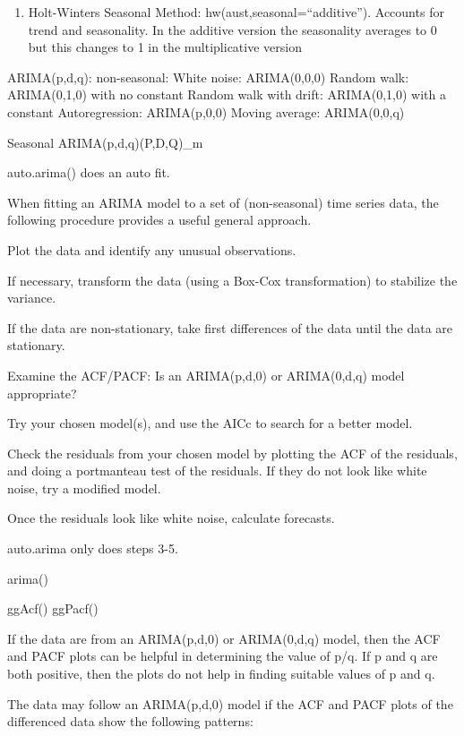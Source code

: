 \documentclass[]{book}
\providecommand{\tightlist}{%
  \setlength{\itemsep}{0pt}\setlength{\parskip}{0pt}}
\theoremstyle{definition}
\theoremstyle{definition}
\theoremstyle{definition}
\theoremstyle{remark}
\begin{document}
\begin{enumerate}
\def\labelenumi{\arabic{enumi}.}
\setcounter{enumi}{7}
\tightlist
\item
  Holt-Winters Seasonal Method: hw(aust,seasonal=``additive''). Accounts
  for trend and seasonality. In the additive version the seasonality
  averages to 0 but this changes to 1 in the multiplicative version
\end{enumerate}

ARIMA(p,d,q): non-seasonal: White noise: ARIMA(0,0,0) Random walk:
ARIMA(0,1,0) with no constant Random walk with drift: ARIMA(0,1,0) with
a constant Autoregression: ARIMA(p,0,0) Moving average: ARIMA(0,0,q)

Seasonal ARIMA(p,d,q)(P,D,Q)\_m

auto.arima() does an auto fit.

When fitting an ARIMA model to a set of (non-seasonal) time series data,
the following procedure provides a useful general approach.

Plot the data and identify any unusual observations.

If necessary, transform the data (using a Box-Cox transformation) to
stabilize the variance.

If the data are non-stationary, take first differences of the data until
the data are stationary.

Examine the ACF/PACF: Is an ARIMA(p,d,0) or ARIMA(0,d,q) model
appropriate?

Try your chosen model(s), and use the AICc to search for a better model.

Check the residuals from your chosen model by plotting the ACF of the
residuals, and doing a portmanteau test of the residuals. If they do not
look like white noise, try a modified model.

Once the residuals look like white noise, calculate forecasts.

auto.arima only does steps 3-5.

arima()

ggAcf() \textbar{} ggPacf()

If the data are from an ARIMA(p,d,0) or ARIMA(0,d,q) model, then the ACF
and PACF plots can be helpful in determining the value of p/q. If p and
q are both positive, then the plots do not help in finding suitable
values of p and q.

The data may follow an ARIMA(p,d,0) model if the ACF and PACF plots of
the differenced data show the following patterns:
\end{document}

